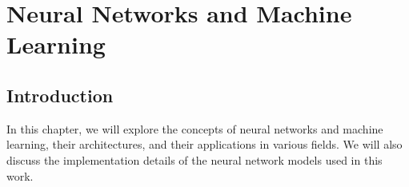 
%

\chapter{Neural Networks and Machine Learning}
\label{cha:neural_networks_and_machine_learning}

\section{Introduction}
In this chapter, we will explore the concepts of neural networks and machine learning, their architectures, and their applications in various fields. 
We will also discuss the implementation details of the neural network models used in this work.

